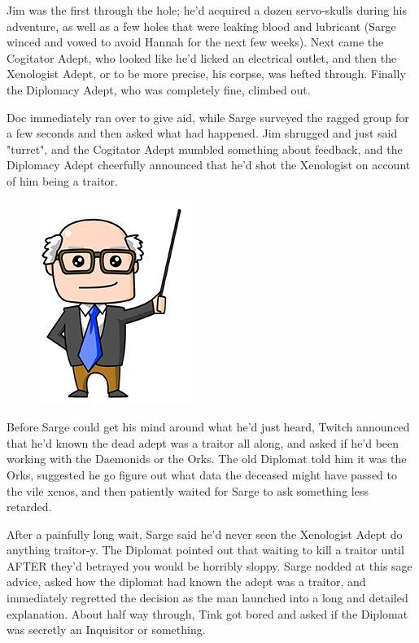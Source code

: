 Jim was the first through the hole; 
he'd acquired a dozen servo-skulls during his adventure, as well as a few holes that were leaking blood and lubricant (Sarge winced and vowed to avoid Hannah for the next few weeks). 
Next came the Cogitator Adept, who looked like he'd licked an electrical outlet, and then the Xenologist Adept, or to be more precise, his corpse, was hefted through. 
Finally the Diplomacy Adept, who was completely fine, climbed out.

Doc immediately ran over to give aid, while Sarge surveyed the ragged group for a few seconds and then asked what had happened. 
Jim shrugged and just said "turret", and the Cogitator Adept mumbled something about feedback, and the Diplomacy Adept cheerfully announced that he'd shot the Xenologist on account of him being a traitor.

\begin{figure}
	\begin{center}
		\includegraphics[width=\figwidth]{pics/16/62.png}
	\end{center}
\end{figure}
Before Sarge could get his mind around what he'd just heard, Twitch announced that he'd known the dead adept was a traitor all along, and asked if he'd been working with the Daemonids or the Orks. 
The old Diplomat told him it was the Orks, suggested he go figure out what data the deceased might have passed to the vile xenos, and then patiently waited for Sarge to ask something less retarded.

After a painfully long wait, Sarge said he'd never seen the Xenologist Adept do anything traitor-y. 
The Diplomat pointed out that waiting to kill a traitor until AFTER they'd betrayed you would be horribly sloppy. 
Sarge nodded at this sage advice, asked how the diplomat had known the adept was a traitor, and immediately regretted the decision as the man launched into a long and detailed explanation. 
About half way through, Tink got bored and asked if the Diplomat was secretly an Inquisitor or something. 


